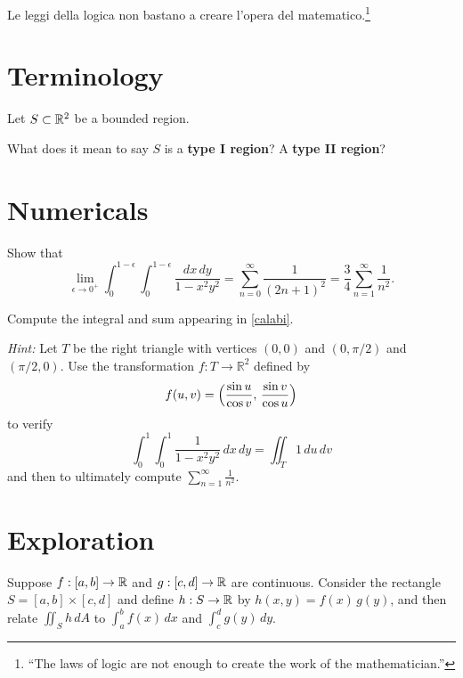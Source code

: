 \documentclass{homework}
\author{Jim Fowler}
\begin{document}
\maketitle

\begin{inspiration}
Le leggi della logica non bastano a creare l'opera del matematico.\footnote{``The laws of logic are not enough to create the work of the mathematician.''}
\end{inspiration}

\section{Terminology}

\begin{problem}
  Let $S\subset \mathbb{R}^2$ be a bounded region.

  What does it mean to say $S$ is a \textbf{type I region}?
  A \textbf{type II region}?
\end{problem}

\section{Numericals}

\begin{problem}\label{calabi}%
Show that
\[
\lim_{\epsilon \to 0^{+}} \int_{0}^{1-\epsilon}\int_{0}^{1-\epsilon}\frac{dx\,dy}{1-x^{2}y^{2}}
=\sum_{n=0}^{\infty}\frac{1}{(2n+1)^{2}}
=\frac{3}{4}\sum_{n=1}^{\infty}\frac{1}{n^{2}}.
\]
\end{problem}

\begin{problem}
Compute the integral and sum appearing in \ref{calabi}.

\textit{Hint:} Let $T$ be the right triangle with vertices $(0,0)$ and $(0,\pi/2)$ and $(\pi/2,0)$. Use the transformation $f\colon T\to\mathbb{R}^{2}$ defined by
\[
f(u,v)=\Bigl(\frac{\sin u}{\cos v},\,\frac{\sin v}{\cos u}\Bigr)
\]
to verify
\[
\int_{0}^{1}\int_{0}^{1}\frac{1}{1-x^{2}y^{2}} \, dx \, dy
=\iint_{T}1\,du\,dv
\]
and then to ultimately compute $\displaystyle\sum_{n=1}^{\infty}\frac{1}{n^{2}}$.
\end{problem}

\section{Exploration}

\begin{problem}\label{product-formula}%
  Suppose $f : [a,b] \to \mathbb{R}$ and $g : [c,d] \to \mathbb{R}$ are continuous. Consider the rectangle $S = [a,b] \times [c,d]$ and define $h : S \to \mathbb{R}$ by $h(x,y) = f(x) \, g(y)$, and then relate $\iint_S h \, dA$ to $\int_a^b f(x) \, dx$ and $\int_c^d g(y) \, dy$.
\end{problem}
\end{document}
